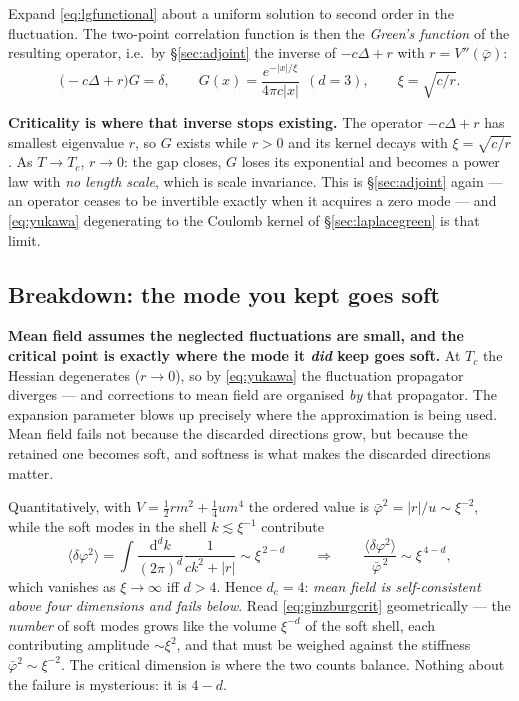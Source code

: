 \documentclass[10pt,a4paper]{article}
\newcommand{\dd}{\mathrm{d}}
\theoremstyle{plain}
\theoremstyle{definition}
\numberwithin{equation}{section}
\begin{document}
Expand \eqref{eq:lgfunctional} about a uniform solution to second order in the fluctuation. The
two-point correlation function is then the \emph{Green's function} of the resulting operator,
i.e.\ by \S\ref{sec:adjoint} the inverse of $-c\Delta+r$ with $r=V''(\bar\varphi)$:
\begin{equation}
\big(-c\Delta+r\big)G=\delta ,
\qquad
G(x)=\frac{e^{-|x|/\xi}}{4\pi c|x|}\ \ (d=3),
\qquad \xi=\sqrt{c/r} .
\label{eq:yukawa}
\end{equation}
\begin{keybox}
\textbf{Criticality is where that inverse stops existing.} The operator $-c\Delta+r$ has
smallest eigenvalue $r$, so $G$ exists while $r>0$ and its kernel decays with
$\xi=\sqrt{c/r}$. As $T\to T_c$, $r\to0$: the gap closes, $G$ loses its exponential and becomes
a power law with \emph{no length scale}, which is scale invariance. This is
\S\ref{sec:adjoint} again --- an operator ceases to be invertible exactly when it acquires a
zero mode --- and \eqref{eq:yukawa} degenerating to the Coulomb kernel of
\S\ref{sec:laplacegreen} is that limit.
\end{keybox}

\subsection{Breakdown: the mode you kept goes soft}
\label{sec:mfbreak}

\begin{keybox}
\textbf{Mean field assumes the neglected fluctuations are small, and the critical point is
exactly where the mode it \emph{did} keep goes soft.} At $T_c$ the Hessian degenerates
($r\to0$), so by \eqref{eq:yukawa} the fluctuation propagator diverges --- and corrections to
mean field are organised \emph{by} that propagator. The expansion parameter blows up precisely
where the approximation is being used. Mean field fails not because the discarded directions
grow, but because the retained one becomes soft, and softness is what makes the discarded
directions matter.
\end{keybox}

\noindent Quantitatively, with $V=\tfrac12rm^2+\tfrac14um^4$ the ordered value is
$\bar\varphi^2=|r|/u\sim\xi^{-2}$, while the soft modes in the shell $k\lesssim\xi^{-1}$
contribute
\begin{equation}
\big\langle\delta\varphi^2\big\rangle=\int\!\frac{\dd^dk}{(2\pi)^d}\frac{1}{ck^2+|r|}\sim\xi^{\,2-d}
\qquad\Longrightarrow\qquad
\frac{\langle\delta\varphi^2\rangle}{\bar\varphi^{\,2}}\sim\xi^{\,4-d} ,
\label{eq:ginzburgcrit}
\end{equation}
which vanishes as $\xi\to\infty$ iff $d>4$. Hence $d_c=4$: \emph{mean field is
self-consistent above four dimensions and fails below}. Read \eqref{eq:ginzburgcrit}
geometrically --- the \emph{number} of soft modes grows like the volume $\xi^{-d}$ of the soft
shell, each contributing amplitude $\sim\xi^2$, and that must be weighed against the stiffness
$\bar\varphi^2\sim\xi^{-2}$. The critical dimension is where the two counts balance. Nothing
about the failure is mysterious: it is $4-d$.
\end{document}
